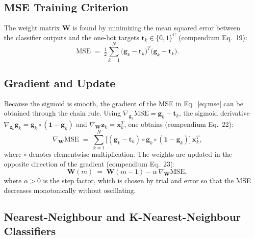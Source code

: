 \documentclass[11pt,a4paper]{article}
\begin{document}
\subsection{MSE Training Criterion}

The weight matrix $\mathbf{W}$ is found by minimizing the mean squared error between the classifier outputs and the one-hot targets $\mathbf{t}_k \in \{0,1\}^C$ (compendium Eq.~19):
\begin{equation}
    \mathrm{MSE} \;=\; \tfrac{1}{2}\sum_{k=1}^{N} \bigl(\mathbf{g}_k - \mathbf{t}_k\bigr)^T \bigl(\mathbf{g}_k - \mathbf{t}_k\bigr).
    \label{eq:mse}
\end{equation}

\subsection{Gradient and Update}

Because the sigmoid is smooth, the gradient of the MSE in Eq.~\eqref{eq:mse} can be obtained through the chain rule. Using $\nabla_{\mathbf{g}_k}\mathrm{MSE} = \mathbf{g}_k - \mathbf{t}_k$, the sigmoid derivative $\nabla_{\mathbf{z}_k}\mathbf{g}_k = \mathbf{g}_k \circ (\mathbf{1}-\mathbf{g}_k)$ and $\nabla_{\mathbf{W}}\mathbf{z}_k = \mathbf{x}_k^T$, one obtains (compendium Eq.~22):
\begin{equation}
    \nabla_{\mathbf{W}} \mathrm{MSE}
    \;=\; \sum_{k=1}^{N}
    \bigl[(\mathbf{g}_k - \mathbf{t}_k)\circ \mathbf{g}_k \circ (\mathbf{1} - \mathbf{g}_k)\bigr]\,\mathbf{x}_k^T,
    \label{eq:gradient}
\end{equation}
where $\circ$ denotes elementwise multiplication. The weights are updated in the opposite direction of the gradient (compendium Eq.~23):
\begin{equation}
    \mathbf{W}(m) \;=\; \mathbf{W}(m-1) - \alpha\,\nabla_{\mathbf{W}} \mathrm{MSE},
    \label{eq:update}
\end{equation}
where $\alpha > 0$ is the step factor, which is chosen by trial and error so that the MSE decreases monotonically without oscillating.

\subsection{Nearest-Neighbour and K-Nearest-Neighbour Classifiers}
\label{subsec:nn_theory}
\end{document}
